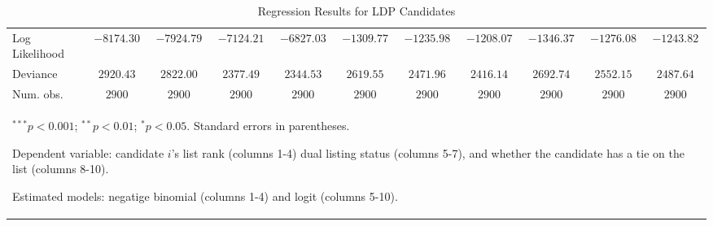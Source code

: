 \begin{table}
\begin{center}
\begin{tabular}{l c c c c c c c c c c}
Log Likelihood     & $-8174.30$    & $-7924.79$    & $-7124.21$    & $-6827.03$    & $-1309.77$   & $-1235.98$   & $-1208.07$   & $-1346.37$   & $-1276.08$   & $-1243.82$    \\
Deviance           & $2920.43$     & $2822.00$     & $2377.49$     & $2344.53$     & $2619.55$    & $2471.96$    & $2416.14$    & $2692.74$    & $2552.15$    & $2487.64$     \\
Num. obs.          & $2900$        & $2900$        & $2900$        & $2900$        & $2900$       & $2900$       & $2900$       & $2900$       & $2900$       & $2900$        \\
\hline
\multicolumn{11}{l}{\scriptsize{\item $^{***}p<0.001$; $^{**}p<0.01$; $^{*}p<0.05$. Standard errors in parentheses.
\item Dependent variable: candidate $i$'s list rank (columns 1-4) dual listing status (columns 5-7), and whether the candidate has a tie on the list (columns 8-10).
\item Estimated models: negatige binomial (columns 1-4) and logit (columns 5-10).}}
\end{tabular}
\caption{Regression Results for LDP Candidates}
\label{tab:ldp}
\end{center}
\end{table}
